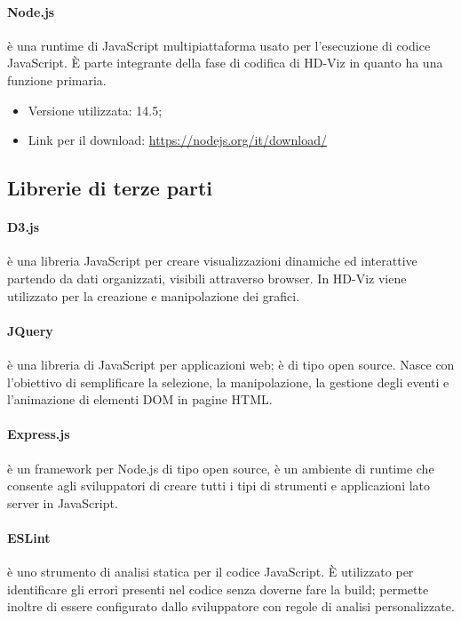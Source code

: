 \documentclass[../manuale_sviluppatore.tex]{subfiles}
\begin{document}
\paragraph{Node.js}
 è una runtime di JavaScript  multipiattaforma usato per l’esecuzione di codice JavaScript.  
È parte integrante della fase di codifica di HD-Viz in quanto ha una funzione primaria.\\
\begin{itemize}
    \item Versione utilizzata: 14.5;
    \item Link per il download: \url{https://nodejs.org/it/download/}
\end{itemize}



\subsection{Librerie di terze parti}

\paragraph{D3.js}
 è una libreria JavaScript per creare visualizzazioni dinamiche ed interattive partendo da dati organizzati, visibili attraverso browser. 
In HD-Viz viene utilizzato per la creazione e manipolazione dei grafici.

\paragraph{JQuery}
 è una libreria di JavaScript per applicazioni web; è di tipo open source. Nasce con l'obiettivo di semplificare la selezione, la manipolazione, la gestione degli eventi e l'animazione di elementi DOM in pagine HTML.

\paragraph{Express.js}
 è un framework per Node.js di tipo open source, è un ambiente di runtime che consente agli sviluppatori di creare tutti i tipi di strumenti e applicazioni lato server in JavaScript.

\paragraph{ESLint}
 è uno strumento di analisi statica per il codice JavaScript. È utilizzato per identificare gli errori presenti nel codice senza doverne fare la build; 
permette inoltre di essere configurato dallo sviluppatore con regole di analisi personalizzate.
\end{document}
